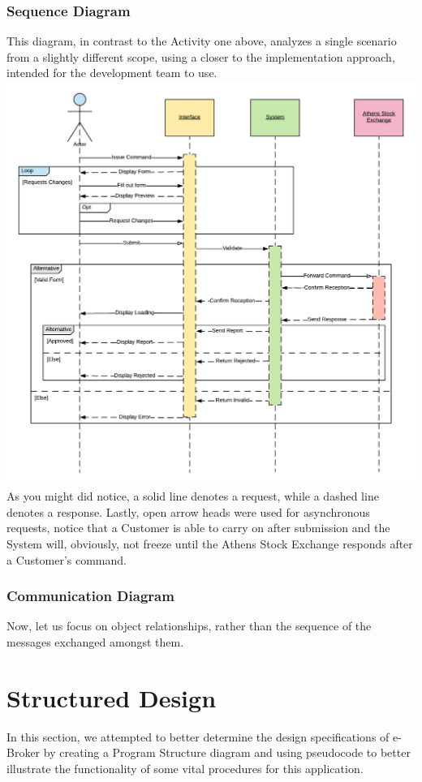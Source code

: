 \documentclass{article}
\begin{document}
\subsubsection{Sequence Diagram}
This diagram, in contrast to the Activity one above, analyzes a single scenario from a slightly different scope, using a closer to the implementation approach, intended for the development team to use.\\ 
\includegraphics[scale=0.25]{sequence}\\
As you might did notice, a solid line denotes a request, while a dashed line denotes a response. Lastly, open arrow heads were used for asynchronous requests, notice that a Customer is able to carry on after submission and the System will, obviously, not freeze until the Athens Stock Exchange responds after a Customer's command.

\newpage
\subsubsection{Communication Diagram}
Now, let us focus on object relationships, rather than the sequence of the messages exchanged amongst them.


\newpage
\section{Structured Design}
In this section, we attempted to better determine the design specifications of e-Broker by creating a Program Structure diagram and using pseudocode to better illustrate the functionality of some vital procedures for this application. 
\end{document}

